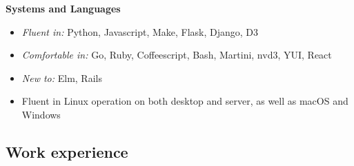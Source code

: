 \hspace{-1.5em}\textbf{Systems and Languages}

\begin{itemize}
  \item \textit{Fluent in:} Python, Javascript, Make, Flask, Django, D3
  \item \textit{Comfortable in:} Go, Ruby, Coffeescript, Bash, Martini, nvd3, YUI, React
  \item \textit{New to:} Elm, Rails
  \item Fluent in Linux operation on both desktop and server, as well as macOS and Windows
\end{itemize}

\newpage

\subsection{Work experience}

